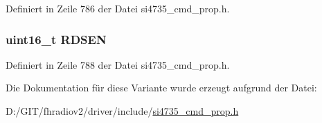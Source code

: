 Definiert in Zeile 786 der Datei si4735\+\_\+cmd\+\_\+prop.\+h.

\hypertarget{unionfm__rds__config_ad71a7ca46176641616c4938efc2778ed}{}
\subsubsection[{R\+D\+S\+E\+N}]{\setlength{\rightskip}{0pt plus 5cm}uint16\+\_\+t R\+D\+S\+E\+N}\label{unionfm__rds__config_ad71a7ca46176641616c4938efc2778ed}


Definiert in Zeile 788 der Datei si4735\+\_\+cmd\+\_\+prop.\+h.



Die Dokumentation für diese Variante wurde erzeugt aufgrund der Datei\+:\begin{DoxyCompactItemize}
\item 
D\+:/\+G\+I\+T/fhradiov2/driver/include/\hyperlink{si4735__cmd__prop_8h}{si4735\+\_\+cmd\+\_\+prop.\+h}\end{DoxyCompactItemize}
